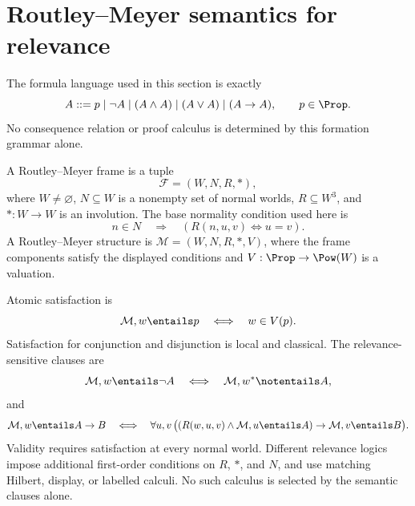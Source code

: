\section{Routley--Meyer semantics for relevance}
\label{sec:relevance-linear-02}

The formula language used in this section is exactly
\[
  A::=p\mid\neg A\mid(A\land A)\mid(A\lor A)\mid(A\to A),
  \qquad p\in\Prop.
\]
No consequence relation or proof calculus is determined by this formation
grammar alone.

\begin{definition}
A Routley--Meyer frame is a tuple
\[
  \mathcal F=(W,N,R,{*}),
\]
where \(W\ne\varnothing\), \(N\subseteq W\) is a nonempty set of normal worlds,
\(R\subseteq W^3\), and \({*}:W\to W\) is an involution.  The base normality
condition used here is
\[
  n\in N
  \quad\Longrightarrow\quad
  (R(n,u,v)\Longleftrightarrow u=v).
\]
A Routley--Meyer structure is
\(\mathcal M=(W,N,R,{*},V)\), where the frame components satisfy the displayed
conditions and \(V:\Prop\to\Pow(W)\) is a valuation.
\end{definition}

Atomic satisfaction is
\[
  \mathcal M,w\entails p
  \quad\Longleftrightarrow\quad
  w\in V(p).
\]
Satisfaction for conjunction and disjunction is local and classical.  The
relevance-sensitive clauses are
\[
  \mathcal M,w\entails\neg A
  \quad\Longleftrightarrow\quad
  \mathcal M,w^*\notentails A,
\]
and
\[
  \mathcal M,w\entails A\to B
  \quad\Longleftrightarrow\quad
  \forall u,v\,
  \bigl((R(w,u,v)\land\mathcal M,u\entails A)
        \to\mathcal M,v\entails B\bigr).
\]
Validity requires satisfaction at every normal world.  Different relevance
logics impose additional first-order conditions on \(R\), \({*}\), and \(N\),
and use matching Hilbert, display, or labelled calculi.  No such calculus is
selected by the semantic clauses alone.

